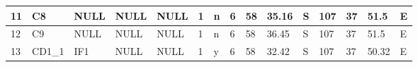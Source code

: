 {\begin{table}[]
\begin{tabular}{|l|l|l|l|l|l|l|l|l|l|l|l|l|l|l|}
		11                                & C8                                        & NULL                                      & NULL                            & NULL                            & 1                               & n                                    & 6                                                                                    & 58                                                                                   & 35.16                                                                                & S                                                                                 & 107                                                                                   & 37                                                                                    & 51.5                                                                                  & E                                                                                  \\ \hline
		12                                & C9                                        & NULL                                      & NULL                            & NULL                            & 1                               & n                                    & 6                                                                                    & 58                                                                                   & 36.45                                                                                & S                                                                                 & 107                                                                                   & 37                                                                                    & 51.5                                                                                  & E                                                                                  \\ \hline
		13                                & CD1\_1                                    & IF1                                       & NULL                            & NULL                            & 1                               & y                                    & 6                                                                                    & 58                                                                                   & 32.42                                                                                & S                                                                                 & 107                                                                                   & 37                                                                                    & 50.32                                                                                 & E                                                                                  \\ \hline

\end{tabular}
\end{table}}
